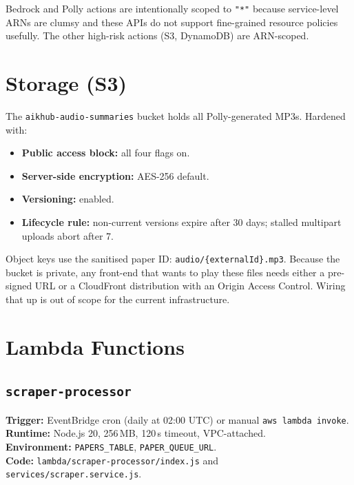 \documentclass[11pt,a4paper]{article}
\begin{document}
Bedrock and Polly actions are intentionally scoped to \texttt{"*"} because service-level ARNs are clumsy and these APIs do not support fine-grained resource policies usefully. The other high-risk actions (S3, DynamoDB) are ARN-scoped.

\section{Storage (S3)}

The \texttt{aikhub-audio-summaries} bucket holds all Polly-generated MP3s. Hardened with:
\begin{itemize}[leftmargin=*]
  \item \textbf{Public access block:} all four flags on.
  \item \textbf{Server-side encryption:} AES-256 default.
  \item \textbf{Versioning:} enabled.
  \item \textbf{Lifecycle rule:} non-current versions expire after 30 days; stalled multipart uploads abort after 7.
\end{itemize}

Object keys use the sanitised paper ID: \texttt{audio/\{externalId\}.mp3}. Because the bucket is private, any front-end that wants to play these files needs either a pre-signed URL or a CloudFront distribution with an Origin Access Control. Wiring that up is out of scope for the current infrastructure.

\section{Lambda Functions}

\subsection{\texttt{scraper-processor}}

\textbf{Trigger:} EventBridge cron (daily at 02:00 UTC) or manual \texttt{aws lambda invoke}. \\
\textbf{Runtime:} Node.js 20, 256\,MB, 120\,s timeout, VPC-attached. \\
\textbf{Environment:} \texttt{PAPERS\_TABLE}, \texttt{PAPER\_QUEUE\_URL}. \\
\textbf{Code:} \texttt{lambda/scraper-processor/index.js} and \texttt{services/scraper.service.js}.
\end{document}
